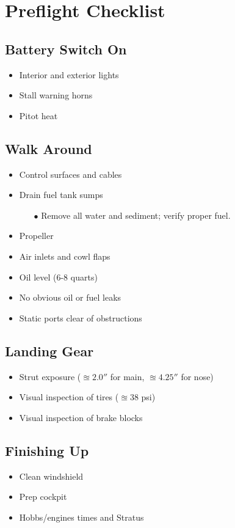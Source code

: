 \def\todoitem#1{
    \item[$\square$] #1 \dotfill
}

\section{Preflight Checklist}

\subsection{Battery Switch On}

\begin{itemize}
    \todoitem{Interior and exterior lights}
    \todoitem{Stall warning horns}
    \todoitem{Pitot heat}
\end{itemize}

\subsection{Walk Around}


\begin{itemize}
    \todoitem{Control surfaces and cables}
    \todoitem{Drain fuel tank sumps}
    \begin{itemize}
        \item[$\bullet$] Remove all water and sediment; verify proper fuel.
    \end{itemize}
    \todoitem{Propeller}
    \todoitem{Air inlets and cowl flaps}
    \todoitem{Oil level (6-8 quarts)}
    \todoitem{No obvious oil or fuel leaks}
    \todoitem{Static ports clear of obstructions}
\end{itemize}

\subsection{Landing Gear}

\begin{itemize}
    \todoitem{Strut exposure ($\approxeq 2.0''$ for main, $\approxeq 4.25''$ for nose)}
    \todoitem{Visual inspection of tires ($\approxeq 38$ psi)}
    \todoitem{Visual inspection of brake blocks}
\end{itemize}

\subsection{Finishing Up}

\begin{itemize}
    \todoitem{Clean windshield}
    \todoitem{Prep cockpit}
    \todoitem{Hobbs/engines times and Stratus}
\end{itemize}
